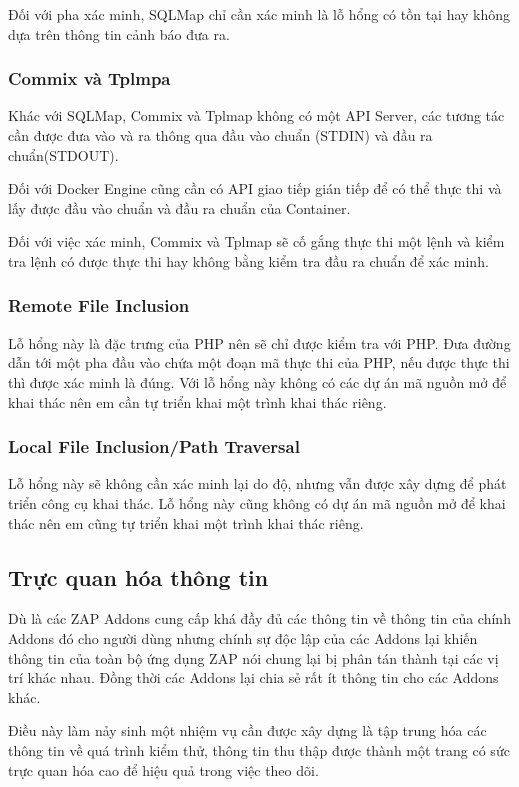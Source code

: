 \documentclass[./../main.tex]{subfiles}
\begin{document}
Đối với pha xác minh, SQLMap chỉ cần xác minh là lỗ hổng có tồn tại hay không dựa trên thông tin cảnh báo đưa ra.
\subsubsection{Commix và Tplmpa}
Khác với SQLMap, Commix và Tplmap không có một API Server, các tương tác cần được đưa vào và ra thông qua đầu vào chuẩn (STDIN) và đầu ra chuẩn(STDOUT).

Đối với Docker Engine cũng cần có API giao tiếp gián tiếp để có thể thực thi và lấy được đầu vào chuẩn và đầu ra chuẩn của Container.


Đối với việc xác minh, Commix và Tplmap sẽ cố gắng thực thi một lệnh và kiểm tra lệnh có được thực thi hay không bằng kiểm tra đầu ra chuẩn để xác minh.

\subsubsection{Remote File Inclusion}
Lỗ hổng này là đặc trưng của PHP nên sẽ chỉ được kiểm tra với PHP. Đưa đường dẫn tới một pha đầu vào chứa một đoạn mã thực thi của PHP, nếu được thực thi thì được xác minh là đúng. Với lỗ hổng này không có các dự án mã nguồn mở để khai thác nên em cần tự triển khai một trình khai thác riêng.
\subsubsection{Local File Inclusion/Path Traversal}
Lỗ hổng này sẽ không cần xác minh lại do độ, nhưng vẫn được xây dựng để phát triển công cụ khai thác. Lỗ hổng này cũng không có dự án mã nguồn mở để khai thác nên em cũng tự triển khai một trình khai thác riêng.

\subsection{Trực quan hóa thông tin}
Dù là các ZAP Addons cung cấp khá đầy đủ các thông tin về thông tin của chính Addons đó cho người dùng nhưng chính sự độc lập của các Addons lại khiến thông tin của toàn bộ ứng dụng ZAP nói chung lại bị phân tán thành tại các vị trí khác nhau. Đồng thời các Addons lại chia sẻ rất ít thông tin cho các Addons khác.

Điều này làm nảy sinh một nhiệm vụ cần được xây dựng là tập trung hóa các thông tin về quá trình kiểm thử, thông tin thu thập được thành một trang có sức trực quan hóa cao để hiệu quả trong việc theo dõi.
\end{document}
